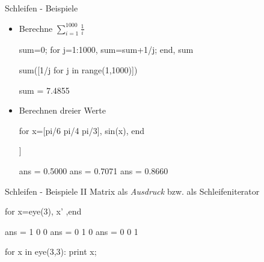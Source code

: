 \documentclass[hyperref={xetex}]{beamer}
\begin{document}
%
%
\begin{frame}[fragile]{Schleifen - Beispiele}
\begin{itemize}
\item Berechne $\sum_{i=1}^{1000} \frac{1}{i}$
\begin{matlabin}
sum=0; for j=1:1000, sum=sum+1/j; end, sum
\end{matlabin}
\begin{pyin}
sum([1/j for j in range(1,1000)])
\end{pyin}
\begin{matlab}
sum =  7.4855 
\end{matlab}
\item Berechnen dreier Werte
\begin{matlabin}
for x=[pi/6 pi/4 pi/3], sin(x), end
\end{matlabin}
\begin{pyin}
[sin(x) for x in [pi/6,pi/4,pi/3]]
\end{pyin}
\begin{matlab}
ans =    0.5000
ans =    0.7071
ans =    0.8660 
\end{matlab}
\end{itemize}
\end{frame}

\begin{frame}[fragile]{Schleifen - Beispiele II}
Matrix als {\it Ausdruck} bzw. als Schleifeniterator
\begin{matlabin}
for x=eye(3),  x' ,end
\end{matlabin}
\begin{matlab}
ans =     1     0     0
ans =     0     1     0
ans =     0     0     1 
\end{matlab}
\begin{pyin}
for x in eye(3,3): print x;
\end{pyin}
\begin{pyout}
  [ 1.  0.  0.]
  [ 0.  1.  0.]
  [ 0.  0.  1.]
\end{pyout}
\end{frame}
\end{document}
